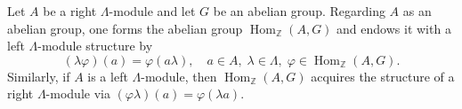 Let $A$ be a right $\Lambda$-module and let $G$ be an abelian group. Regarding $A$ as an abelian group, one forms the abelian group $\operatorname{Hom}_{\mathbb{Z}}(A, G)$ and endows it with a left $\Lambda$-module structure by
$$(\lambda \varphi)(a) = \varphi(a \lambda), \quad a \in A,\; \lambda \in \Lambda,\; \varphi \in \operatorname{Hom}_{\mathbb{Z}}(A, G).$$
Similarly, if $A$ is a left $\Lambda$-module, then $\operatorname{Hom}_{\mathbb{Z}}(A, G)$ acquires the structure of a right $\Lambda$-module via $(\varphi \lambda)(a) = \varphi(\lambda a)$.
